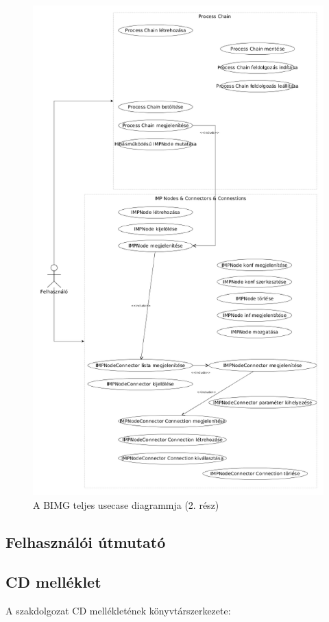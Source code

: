 \documentclass[a4paper,12pt,oneside]{report}
\begin{document}
\begin{figure}[h]
  \includegraphics[width=\textwidth]{usecase_part_2.png}
  \caption{A BIMG teljes usecase diagrammja (2. rész) }
  \label{fig:bimg_usecase_schema_part_2}
\end{figure}


\subsection{Felhasználói útmutató}

\subsection{CD melléklet}
A szakdolgozat CD mellékletének könyvtárszerkezete:
\end{document}
